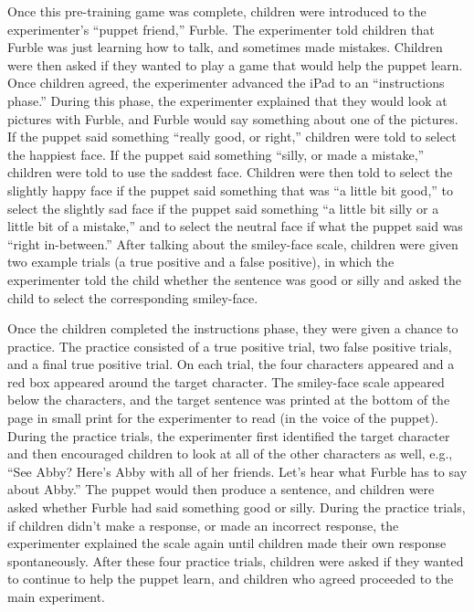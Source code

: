 \documentclass[man, noapacite]{apa2}
\begin{document}
Once this pre-training game was complete, children were introduced to the experimenter's ``puppet friend,'' Furble. The experimenter told children that Furble was just learning how to talk, and sometimes made mistakes. Children were then asked if they wanted to play a game that would help the puppet learn. Once children agreed, the experimenter advanced the iPad to an ``instructions phase.'' During this phase, the experimenter explained that they would look at pictures with Furble, and Furble would say something about one of the pictures. If the puppet said something ``really good, or right,'' children were told to select the happiest face. If the puppet said something ``silly, or made a mistake,'' children were told to use the saddest face. Children were then told to select the slightly happy face if the puppet said something that was ``a little bit good,'' to select the slightly sad face if the puppet said something ``a little bit silly or a little bit of a mistake,'' and to select the neutral face if what the puppet said was ``right in-between.'' After talking about the smiley-face scale, children were given two example trials (a true positive and a false positive), in which the experimenter told the child whether the sentence was good or silly and asked the child to select the corresponding smiley-face.

Once the children completed the instructions phase, they were given a chance to practice. The practice consisted of a true positive trial, two false positive trials, and a final true positive trial. On each trial, the four characters appeared and a red box appeared around the target character. The smiley-face scale appeared below the characters, and the target sentence was printed at the bottom of the page in small print for the experimenter to read (in the voice of the puppet). During the practice trials, the experimenter first identified the target character and then encouraged children to look at all of the other characters as well, e.g., ``See Abby? Here's Abby with all of her friends. Let's hear what Furble has to say about Abby.'' The puppet would then produce a sentence, and children were asked whether Furble had said something good or silly. During the practice trials, if children didn't make a response, or made an incorrect response, the experimenter explained the scale again until children made their own response spontaneously. After these four practice trials, children were asked if they wanted to continue to help the puppet learn, and children who agreed proceeded to the main experiment.
\end{document}
